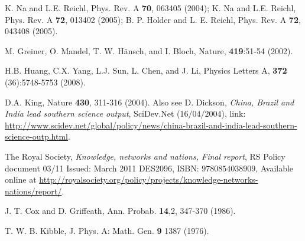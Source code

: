 \documentclass[a4paper,11pt,color]{article}
\renewenvironment{thebibliography}[1]{%
    \begin{oldthebibliography}{#1}%
      \setlength{\parskip}{0ex}%
      \setlength{\itemsep}{0ex}%
  }%
  {%
    \end{oldthebibliography}%
  }
\begin{document}
\begin{thebibliography}{}
K. Na and L.E. Reichl, Phys. Rev. A {\bf 70}, 063405 (2004); K. Na and L.E. Reichl, Phys. Rev. A {\bf 72}, 013402 (2005); B. P. Holder and L. E. Reichl, Phys. Rev. A {\bf 72}, 043408 (2005).

M. Greiner, O. Mandel, T. W. H\"ansch, and I. Bloch, Nature, {\bf 419}:51-54 (2002).

H.B. Huang, C.X. Yang, L.J. Sun, L. Chen, and J. Li, Physics Letters A, {\bf 372} (36):5748-5753 (2008).


D.A. King, Nature {\bf 430}, 311-316 (2004). Also see D. Dickson, \textit{China, Brazil and India lead southern science output}, SciDev.Net ($16/04/2004$), link: \url{http://www.scidev.net/global/policy/news/china-brazil-and-india-lead-southern-science-outp.html}.

The Royal Society, \textit{Knowledge, networks and nations, Final report}, RS Policy document 03/11
Issued: March 2011 DES2096, ISBN: $9780854038909$, Available online at \url{http://royalsociety.org/policy/projects/knowledge-networks-nations/report/}.

J. T. Cox and D. Griffeath, Ann. Probab. {\bf 14},2, 347-370 (1986).

T. W. B. Kibble, J. Phys. A: Math. Gen. {\bf 9} 1387 (1976).

\end{thebibliography}
\end{document}
